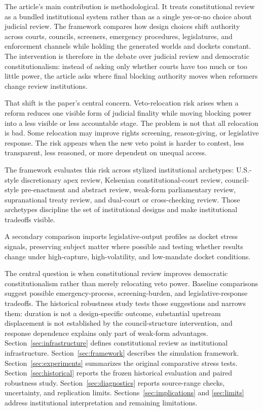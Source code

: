 \documentclass[
  journal=small,
  manuscript=research-article,
  year=2026
]{cup-journal}
\begin{document}
The article's main contribution is methodological. It treats constitutional review as a bundled institutional system rather than as a single yes-or-no choice about judicial review. The framework compares how design choices shift authority across courts, councils, screeners, emergency procedures, legislatures, and enforcement channels while holding the generated worlds and dockets constant. The intervention is therefore in the debate over judicial review and democratic constitutionalism: instead of asking only whether courts have too much or too little power, the article asks where final blocking authority moves when reformers change review institutions.

That shift is the paper's central concern. Veto-relocation risk arises when a reform reduces one visible form of judicial finality while moving blocking power into a less visible or less accountable stage. The problem is not that all relocation is bad. Some relocation may improve rights screening, reason-giving, or legislative response. The risk appears when the new veto point is harder to contest, less transparent, less reasoned, or more dependent on unequal access.

The framework evaluates this risk across stylized institutional archetypes: U.S.-style discretionary apex review, Kelsenian constitutional-court review, council-style pre-enactment and abstract review, weak-form parliamentary review, supranational treaty review, and dual-court or cross-checking review. Those archetypes discipline the set of institutional designs and make institutional tradeoffs visible.

A secondary comparison imports legislative-output profiles as docket stress signals, preserving subject matter where possible and testing whether results change under high-capture, high-volatility, and low-mandate docket conditions.

The central question is when constitutional review improves democratic constitutionalism rather than merely relocating veto power. Baseline comparisons suggest possible emergency-process, screening-burden, and legislative-response tradeoffs. The historical robustness study tests those suggestions and narrows them: duration is not a design-specific outcome, substantial upstream displacement is not established by the council-structure intervention, and response dependence explains only part of weak-form advantages. Section~\ref{sec:infrastructure} defines constitutional review as institutional infrastructure. Section~\ref{sec:framework} describes the simulation framework. Section~\ref{sec:experiments} summarizes the original comparative stress tests. Section~\ref{sec:historical} reports the frozen historical evaluation and paired robustness study. Section~\ref{sec:diagnostics} reports source-range checks, uncertainty, and replication limits. Sections~\ref{sec:implications} and \ref{sec:limits} address institutional interpretation and remaining limitations.
\end{document}
